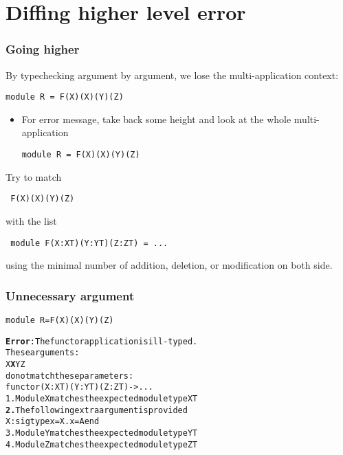 \documentclass[a4paper,11pt]{beamer}
\begin{document}
\section{Diffing higher level error}


\begin{frame}[fragile]\frametitle{Going higher}

  By typechecking argument by argument, we lose the multi-application
  context:
\begin{verbatim}
module R = F(X)(X)(Y)(Z)
\end{verbatim}

  \begin{itemize}
      \item For error message, take back some height and look at the whole
      multi-application
\begin{verbatim}
module R = F(X)(X)(Y)(Z)
\end{verbatim}

  \end{itemize}
Try to match
\begin{verbatim}
 F(X)(X)(Y)(Z)
\end{verbatim}
with the list
\begin{verbatim}
 module F(X:XT)(Y:YT)(Z:ZT) = ...
\end{verbatim}

using the minimal number of addition, deletion, or modification on both side.

\end{frame}


\begin{frame}[fragile]\frametitle{Unnecessary argument}
\begin{verbatim}
module R=F(X)(X)(Y)(Z)
\end{verbatim}
\begin{alltt}
{\bfseries{}\color{red}{}Error}: The functor application is ill-typed.
       These arguments:
         {\color{green}{}X} {\color{red}{}\bfseries{}X} {\color{green}{}Y} {\color{green}{}Z}
       do not match these parameters:
         functor {\color{green}{}(X : XT)} {\color{red}{}\bfseries{}} {\color{green}{}(Y : YT)} {\color{green}{}(Z : ZT)} -> ...
  {\color{green}{}1.} Module X matches the expected module type XT
  {\color{red}{}\bfseries{}2.} The following extra argument is provided
     X : sig type x = X.x = A end
  {\color{green}{}3.} Module Y matches the expected module type YT
  {\color{green}{}4.} Module Z matches the expected module type ZT
\end{alltt}
\end{frame}
\end{document}
